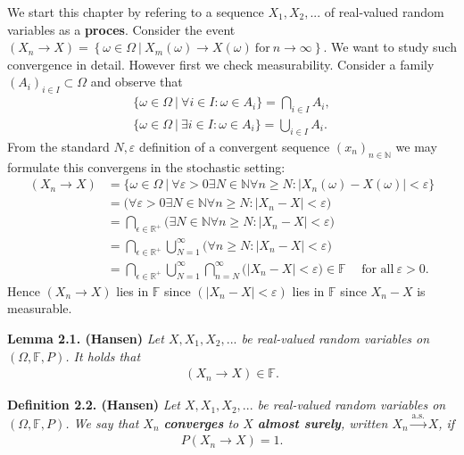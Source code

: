 \documentclass[a4paper,12pt,openany]{book}
\begin{document}
We start this chapter by refering to a sequence \(X_1,X_2,...\) of real-valued random variables as a \textbf{proces}. Consider the event \((X_n\to X)=\left\{\omega\in\Omega\ \vert\ X_m(\omega)\to X(\omega)\ \text{for}\ n\to \infty\right\}\). We want to study such convergence in detail. However first we check measurability. Consider a family \((A_i)_{i\in I}\subset \Omega\) and observe that
\begin{align*}
    \Big\{\omega\in \Omega\ \vert\ \forall i\in I : \omega \in A_i\Big\}=\bigcap_{i\in I} A_i,\tag{2.1}\\
    \Big\{\omega\in \Omega\ \vert\ \exists i\in I : \omega \in A_i\Big\}=\bigcup_{i\in I} A_i.\tag{2.2}
\end{align*}
From the standard \(N,\varepsilon\) definition of a convergent sequence \((x_n)_{n\in \mathbb{N}}\) we may formulate this convergens in the stochastic setting:
\begin{align*}
    (X_n\to X)&=\Big\{\omega\in \Omega\ \vert\ \forall\varepsilon>0 \exists N\in \mathbb{N} \forall n\ge N : \vert X_n(\omega)-X(\omega)\vert <\varepsilon\Big\}\\
    &=\Big(\forall\varepsilon>0 \exists N\in \mathbb{N} \forall n\ge N : \vert X_n-X\vert <\varepsilon\Big)\\
    &=\bigcap_{\epsilon\in \mathbb{R}^+}\Big(\exists N\in \mathbb{N} \forall n\ge N : \vert X_n-X\vert<\varepsilon\Big)\\
    &=\bigcap_{\epsilon\in \mathbb{R}^+}\bigcup_{N=1}^\infty\Big( \forall n\ge N : \vert X_n-X\vert<\varepsilon\Big)\\
    &=\bigcap_{\epsilon\in \mathbb{R}^+}\bigcup_{N=1}^\infty\bigcap_{n=N}^\infty\Big(  \vert X_n-X\vert<\varepsilon\Big)\in \mathbb{F}\hspace{15pt}\text{for all}\ \varepsilon>0.
\end{align*}
Hence \((X_n\to X)\) lies in \(\mathbb{F}\) since \((\vert X_n-X\vert <\varepsilon)\) lies in \(\mathbb{F}\) since \(X_n-X\) is measurable.

\textbf{Lemma 2.1. (Hansen)} \emph{Let \(X,X_1,X_2,...\) be real-valued random variables on \((\Omega, \mathbb{F},P)\). It holds that}
\begin{align*}
    (X_n\to X)\in \mathbb{F}.
\end{align*}

\textbf{Definition 2.2. (Hansen)} \emph{Let \(X,X_1,X_2,...\) be real-valued random variables on \((\Omega,\mathbb{F},P)\). We say that \(X_n\) \textbf{converges} to \(X\) \textbf{almost surely}, written \(X_n\stackrel{\text{a.s.}}{\to}X\), if}
\begin{align*}
    P(X_n\to X)=1.\tag{2.6}
\end{align*}
\end{document}
